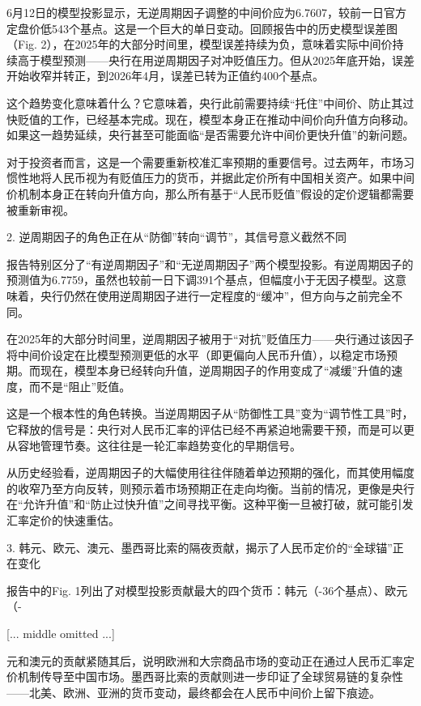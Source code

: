 \documentclass[11pt]{ctexart}
\begin{document}
6月12日的模型投影显示，无逆周期因子调整的中间价应为6.7607，较前一日官方定盘价低543个基点。这是一个巨大的单日变动。回顾报告中的历史模型误差图（Fig. 2），在2025年的大部分时间里，模型误差持续为负，意味着实际中间价持续高于模型预测——央行在用逆周期因子对冲贬值压力。但从2025年底开始，误差开始收窄并转正，到2026年4月，误差已转为正值约400个基点。

这个趋势变化意味着什么？它意味着，央行此前需要持续“托住”中间价、防止其过快贬值的工作，已经基本完成。现在，模型本身正在推动中间价向升值方向移动。如果这一趋势延续，央行甚至可能面临“是否需要允许中间价更快升值”的新问题。

对于投资者而言，这是一个需要重新校准汇率预期的重要信号。过去两年，市场习惯性地将人民币视为有贬值压力的货币，并据此定价所有中国相关资产。如果中间价机制本身正在转向升值方向，那么所有基于“人民币贬值”假设的定价逻辑都需要被重新审视。

2. 逆周期因子的角色正在从“防御”转向“调节”，其信号意义截然不同

报告特别区分了“有逆周期因子”和“无逆周期因子”两个模型投影。有逆周期因子的预测值为6.7759，虽然也较前一日下调391个基点，但幅度小于无因子模型。这意味着，央行仍然在使用逆周期因子进行一定程度的“缓冲”，但方向与之前完全不同。

在2025年的大部分时间里，逆周期因子被用于“对抗”贬值压力——央行通过该因子将中间价设定在比模型预测更低的水平（即更偏向人民币升值），以稳定市场预期。而现在，模型本身已经转向升值，逆周期因子的作用变成了“减缓”升值的速度，而不是“阻止”贬值。

这是一个根本性的角色转换。当逆周期因子从“防御性工具”变为“调节性工具”时，它释放的信号是：央行对人民币汇率的评估已经不再紧迫地需要干预，而是可以更从容地管理节奏。这往往是一轮汇率趋势变化的早期信号。

从历史经验看，逆周期因子的大幅使用往往伴随着单边预期的强化，而其使用幅度的收窄乃至方向反转，则预示着市场预期正在走向均衡。当前的情况，更像是央行在“允许升值”和“防止过快升值”之间寻找平衡。这种平衡一旦被打破，就可能引发汇率定价的快速重估。

3. 韩元、欧元、澳元、墨西哥比索的隔夜贡献，揭示了人民币定价的“全球锚”正在变化

报告中的Fig. 1列出了对模型投影贡献最大的四个货币：韩元（-36个基点）、欧元（-

[... middle omitted ...]

元和澳元的贡献紧随其后，说明欧洲和大宗商品市场的变动正在通过人民币汇率定价机制传导至中国市场。墨西哥比索的贡献则进一步印证了全球贸易链的复杂性——北美、欧洲、亚洲的货币变动，最终都会在人民币中间价上留下痕迹。
\end{document}
